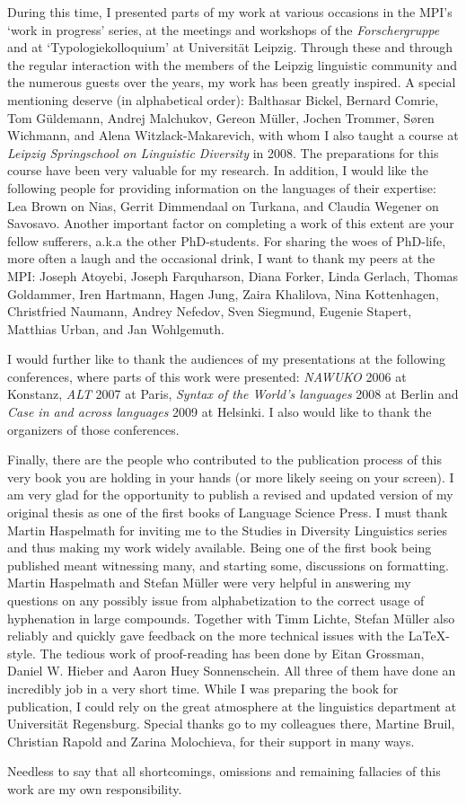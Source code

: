 During this time, I presented parts of my work at various occasions in the MPI's `work in progress' series, at the meetings and workshops of the \textit{Forschergruppe} and at `Typologiekolloquium' at Universit\"at Leipzig.
Through these and through the regular interaction with the members of the Leipzig linguistic community and the numerous guests over the years, my work has been greatly inspired.
A special mentioning deserve (in alphabetical order): Balthasar Bickel, Bernard Comrie, Tom G\"uldemann, Andrej Malchukov, Gereon M\"uller, Jochen Trommer, S\o ren Wichmann, and Alena Witzlack-Makarevich, with whom I also taught a course at \emph{Leipzig Springschool on Linguistic Diversity} in 2008. 
The preparations for this course have been very valuable for my research. 
In addition, I would like the following people for providing information on the languages of their expertise:
Lea Brown on Nias, Gerrit Dimmendaal on Turkana, and Claudia Wegener on Savosavo.
Another important factor on completing a work of this extent are your fellow sufferers, a.k.a the other PhD-students.
For sharing the woes of PhD-life, more often a laugh and the occasional drink, I want to thank my peers at the MPI: Joseph Atoyebi, Joseph Farquharson, Diana Forker, Linda Gerlach, Thomas Goldammer, Iren Hartmann, Hagen Jung, Zaira Khalilova, Nina Kottenhagen, Christfried Naumann, Andrey Nefedov, Sven Siegmund, Eugenie Stapert, Matthias Urban, and Jan Wohlgemuth.

I would further like to thank the audiences of my presentations at the following conferences, where parts of this work were presented:
\emph{NAWUKO} 2006 at Konstanz,  \emph{ALT} 2007 at Paris, \emph{Syntax of the World's languages} 2008 at Berlin and \emph{Case in and across languages} 2009 at Helsinki. 
I also would like to thank the organizers of those conferences.

Finally, there are the people who contributed to the publication process of this very book you are holding in your hands (or more likely seeing on your screen). 
I am very glad for the opportunity to publish a revised and updated version of my original thesis as one of the first books of Language Science Press.
I must thank Martin Haspelmath for inviting me to the Studies in Diversity Linguistics series and thus making my work widely available.
Being one of the first book being published meant witnessing many, and starting some, discussions on formatting.  
Martin Haspelmath and Stefan M\"uller were very helpful in answering my questions on any possibly issue from alphabetization to the correct usage of hyphenation in large compounds.
Together with Timm Lichte, Stefan M\"uller also reliably and quickly gave feedback on the more technical issues with the \LaTeX -style.  
The tedious work of proof-reading has been done by Eitan Grossman, Daniel W. Hieber and Aaron Huey Sonnenschein. 
All three of them have done an incredibly job in a very short time. 
While I was preparing the book for publication, I could rely on the great atmosphere at the linguistics department at Universität Regensburg. 
Special thanks go to my colleagues there, Martine Bruil, Christian Rapold and Zarina Molochieva, for their support in many ways. 

\enlargethispage{\baselineskip}
Needless to say that all shortcomings, omissions and remaining fallacies of this work are my own responsibility.



 